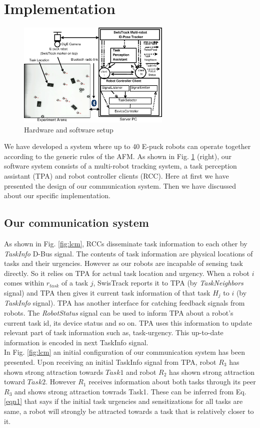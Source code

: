 \documentclass[letterpaper, 10 pt, conference]{ieeeconf}  %
\begin{document}
\section{Implementation}
\label{sec:impl}
\begin{figure}
\centering
\includegraphics[height=5cm, angle=0]
{../dia-files/RIL-Expt-Setup2.eps}
\caption{\small Hardware and software setup}
\label{fig:setup} %
\end{figure}
We have developed a system where up to 40 E-puck robots \cite{Epuck} can operate together according to the generic rules of the AFM. As shown in Fig. \ref{fig:setup} (right), our software system consists of a multi-robot tracking system, a task perception assistant (TPA) and robot controller clients (RCC). Here at first we have presented the design of our communication system. Then we have discussed about our specific implementation. 
\subsection{Our communication system}
As shown in Fig. \ref{fig:lcm}, RCCs  disseminate task information to each other by  \textit{TaskInfo} D-Bus signal. The contents of task information are physical locations of tasks and their urgencies. However as our robots are incapable of sensing task directly. So it relies on TPA for actual task location and urgency. When a robot $i$ comes within $r_{task}$ of a task $j$, SwisTrack reports it to TPA (by {\em TaskNeighbors} signal) and TPA then gives it current task information of that task $H_j$ to $i$ (by {\em TaskInfo} signal).
TPA has another interface for catching feedback signals from robots. The \textit{RobotStatus} signal can be used to inform TPA about a robot's current task id, its device status and so on. TPA uses this information to update relevant part of task information such as, task-urgency. This up-to-date information is encoded in next TaskInfo signal.\\
In Fig. \ref{fig:lcm} an initial configuration of our communication system has been presented. Upon receiving an initial TaskInfo signal from TPA, robot $R_3$ has shown strong attraction towards $Task1$ and robot $R_2$ has shown strong attraction toward $Task2$. However $R_1$ receives information about both tasks through its peer $R_3$ and shows strong attraction towrads Task1. These can be inferred from Eq. \ref{eqn1} that says if the initial task urgencies and sensitizations for all tasks are same, a robot will strongly be attracted towards a task that is relatively closer to it.
\end{document}
